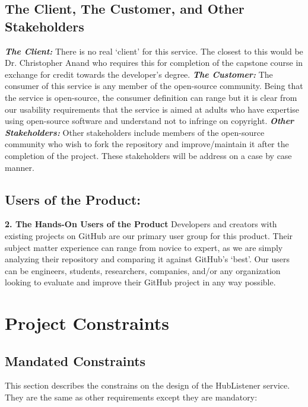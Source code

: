 \documentclass{article}
\begin{document}
\subsection{The Client, The Customer, and Other Stakeholders}
\textbf{\textit{The Client:}}
There is no real `client' for this service. The closest to this would be Dr. Christopher Anand who requires this for completion of the capstone course in exchange for credit towards the developer’s degree. \newline
\textbf{\textit{The Customer:}}
The consumer of this service is any member of the open-source community. Being that the service is open-source, the consumer definition can range but it is clear from our usability requirements that the service is aimed at adults who have expertise using open-source software and understand not to infringe on copyright. \newline
\textbf{\textit{Other Stakeholders:}}
Other stakeholders include members of the open-source community who wish to fork the repository and improve/maintain it after the completion of the project. These stakeholders will be address on a case by case manner. \newline

\subsection{Users of the Product:}
\textbf{2. The Hands-On Users of the Product}
Developers and creators with existing projects on GitHub are our primary user group for this product. Their subject matter experience can range from novice to expert, as we are simply analyzing their repository and comparing it against GitHub’s ‘best’. Our users can be engineers, students, researchers, companies, and/or any organization looking to evaluate and improve their GitHub project in any way possible. 
\newpage


\section{Project Constraints}
\subsection{Mandated Constraints}

This section describes the constrains on the design of the HubListener service. They are the same as other requirements except they are mandatory:\newline
\newline
\end{document}
